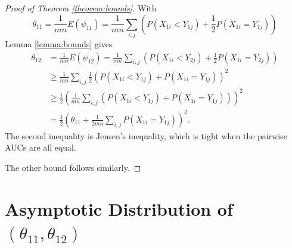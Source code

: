 \documentclass[12pt]{article}
\DeclareMathOperator{\AUC}{AUC}
\newcommand{\E}{E}
\renewcommand{\P}{P}
\newcommand{\cind}{\perp \!\!\! \perp}
\newcommand{\aucindiv}{\theta_{11}}%
\newcommand{\aucpop}{\theta_{12}}%
\newcommand{\Kernel}{\psi}
\begin{document}
\begin{proof}[Proof of Theorem \ref{theorem:bounds}]

  With
  $$
  \aucindiv = \frac{1}{mn}\E(\Kernel_{11}) = \frac{1}{mn}\sum_{i,j}(\P(X_{1i}<Y_{1j})+\frac{1}{2}\P(X_{1i}=Y_{1j}))
  $$
  Lemma \ref{lemma:bounds} gives
  \begin{align}
    \aucpop &= \frac{1}{mn}\E(\Kernel_{12}) = \frac{1}{mn}\sum_{i,j}(P(X_{1i}<Y_{2j})+\frac{1}{2}\P(X_{1i}=Y_{2j}))\\
    &\ge \frac{1}{mn}\sum_{i,j}\frac{1}{2}(\P(X_{1i}<Y_{1j})+\P(X_{1i}=Y_{1j}))^2\\
    &\ge \frac{1}{2}\left(\frac{1}{mn}\sum_{i,j}(\P(X_{1i}<Y_{1j})+\P(X_{1i}=Y_{1j}))\right)^2\\
    &= \frac{1}{2}\left(\aucindiv + \frac{1}{2mn}\sum_{i,j}\P(X_{1i}=Y_{1j})\right)^2.
  \end{align}
  The second inequality is Jensen's inequality, which is tight when
  the pairwise AUCs are all equal.

  The other bound follows similarly.
\end{proof}







\section{Asymptotic Distribution of $(\aucindiv,\aucpop)$}\label{section:asymptotics}
\end{document}
